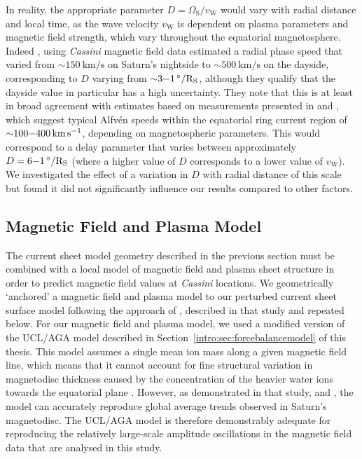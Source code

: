 In reality, the appropriate parameter $D = \Omega_\mathrm{S}/v_\mathrm{W}$ would vary with radial distance and local time, as the wave velocity $v_\mathrm{W}$ is dependent on plasma parameters and magnetic field strength, which vary throughout the equatorial magnetosphere. Indeed \citet{andrews2010}, using \textit{Cassini} magnetic field data estimated a radial phase speed that varied from ${\sim}\SI{150}{\km\per\second}$ on Saturn's nightside to ${\sim}\SI{500}{\km\per\second}$ on the dayside, corresponding to $D$ varying from ${\sim}3{\--}\SI{1}{\degree/R_S}$, although they qualify that the dayside value in particular has a high uncertainty. They note that this is at least in broad agreement with estimates based on measurements presented in \citet{wilson2008} and \citet{mcandrews2009}, which suggest typical Alfv\'{e}n speeds within the equatorial ring current region of ${\sim}100{\--}\SI{400}{\km\per\second}$, depending on magnetospheric parameters. This would correspond to a delay parameter that varies between approximately $D = 6{\--}\SI{1}{\degree/R_S}$ (where a higher value of $D$ corresponds to a lower value of $v_\mathrm{W}$). We investigated the effect of a variation in $D$ with radial distance of this scale but found it did not significantly influence our results compared to other factors. %

\subsection{Magnetic Field and Plasma Model}\label{equinox:sec:plasmamodel}
The current sheet model geometry described in the previous section must be combined with a local model of magnetic field and plasma sheet structure in order to predict magnetic field values at \textit{Cassini} locations. We geometrically `anchored' a magnetic field and plasma model to our perturbed current sheet surface model following the approach of \citet{achilleos2014}, described in that study and repeated below. For our magnetic field and plasma model, we used a modified version of the UCL/AGA model described in Section~\ref{intro:sec:forcebalancemodel} of this thesis. This model assumes a single mean ion mass along a given magnetic field line, which means that it cannot account for fine structural variation in magnetodisc thickness caused by the concentration of the heavier water ions towards the equatorial plane \citep[e.g.][]{persoon2009, nemeth2011}. However, as demonstrated in that study, \citet{achilleos2010b} and \citet{sergis2018}, the model can accurately reproduce global average trends observed in Saturn's magnetodisc. The UCL/AGA model is therefore demonstrably adequate for reproducing the relatively large-scale amplitude oscillations in the magnetic field data that are analysed in this study.

